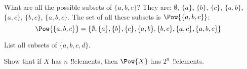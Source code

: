 \documentclass[../../../include/open-logic-section]{subfiles}
\begin{document}
\begin{ex}
What are all the possible subsets of $\{ a, b, c \}$? They are:
$\emptyset$, $\{a \}$, $\{b\}$, $\{c\}$, $\{a, b\}$, $\{a, c\}$, $\{b,
c\}$, $\{a, b, c\}$. The set of all these subsets is
$\Pow{\{a,b,c\}}$:
\[
\Pow{\{ a, b, c \}} = \{\emptyset, \{a \}, \{b\}, \{c\}, \{a, b\},
\{b, c\}, \{a, c\}, \{a, b, c\}\}
\]
\end{ex}

\begin{prob}
List all subsets of $\{a, b, c, d\}$.
\end{prob}

\begin{prob}
Show that if $X$ has $n$ !!{element}s, then $\Pow{X}$ has $2^n$
!!{element}s.
\end{prob}
\end{document}
